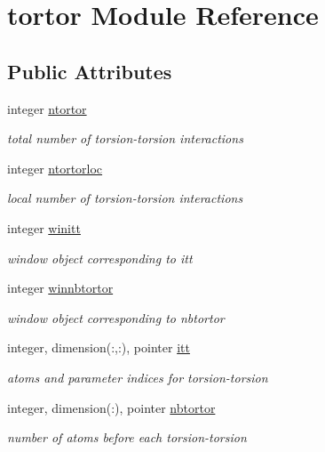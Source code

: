 \hypertarget{classtortor}{\section{tortor Module Reference}
\label{classtortor}
}
\subsection*{Public Attributes}
\begin{DoxyCompactItemize}
\item 
integer \hyperlink{classtortor_a0fde598770f6f4cd056b5577bfc17ffc}{ntortor}
\begin{DoxyCompactList}\small\item\em total number of torsion-\/torsion interactions \end{DoxyCompactList}\item 
integer \hyperlink{classtortor_a38e4da5e763b212eb88e9152f1cab574}{ntortorloc}
\begin{DoxyCompactList}\small\item\em local number of torsion-\/torsion interactions \end{DoxyCompactList}\item 
integer \hyperlink{classtortor_a9ca291a60c5f84b699cdd664e5371e84}{winitt}
\begin{DoxyCompactList}\small\item\em window object corresponding to itt \end{DoxyCompactList}\item 
integer \hyperlink{classtortor_a60ae762814244a4d4e9fcf2938394c07}{winnbtortor}
\begin{DoxyCompactList}\small\item\em window object corresponding to nbtortor \end{DoxyCompactList}\item 
integer, dimension(\-:,\-:), pointer \hyperlink{classtortor_a3f439adf1817c9ea03ef242135e7a87b}{itt}
\begin{DoxyCompactList}\small\item\em atoms and parameter indices for torsion-\/torsion \end{DoxyCompactList}\item 
integer, dimension(\-:), pointer \hyperlink{classtortor_a900d77f3179edf2e0b16ea0b23d2eddd}{nbtortor}
\begin{DoxyCompactList}\small\item\em number of atoms before each torsion-\/torsion \end{DoxyCompactList}\end{DoxyCompactItemize}


